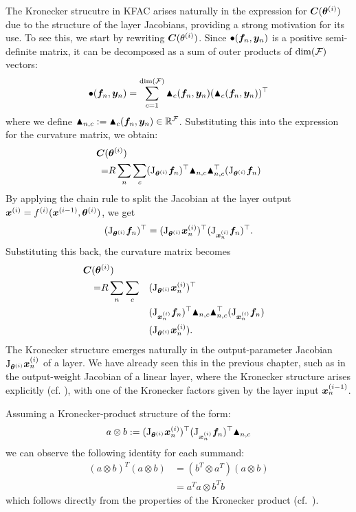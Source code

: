 The Kronecker strucutre in KFAC arises naturally in the expression for ${\bm{C}}({\bm{\theta}}^{(i)})$ due to the structure of the layer Jacobians, providing a strong motivation for its use.
To see this, we start by rewriting ${\bm{C}}(\theta^{(i)})$.
Since $\bullet({\bm{f}}_n, {\bm{y}}_n)$ is a positive semi-definite matrix, it can be decomposed as a sum of outer products of $\dim({\mathcal{F}})$ vectors: $$\bullet({\bm{f}}_n, {\bm{y}}_n) = \sum_{c=1}^{\dim({\mathcal{F}})} \blacktriangle_c({\bm{f}}_n, {\bm{y}}_n) (\blacktriangle_c({\bm{f}}_n, {\bm{y}}_n))^{\top}$$
where we define $\blacktriangle_{n,c} := \blacktriangle_c({\bm{f}}_n, {\bm{y}}_n) \in {\mathbb{R}}^{{\mathcal{F}}}$.
Substituting this into the expression for the curvature matrix, we obtain:
\begin{align*}
  {\bm{C}}(&{\bm{\theta}}^{(i)}) \\
  =&
  R \sum_n \sum_{c}
  (\mathrm{J}_{{\bm{\theta}}^{(i)}} {\bm{f}}_n)^{\top}
  \blacktriangle_{n,c} \blacktriangle_{n,c}^{\top}
  (\mathrm{J}_{{\bm{\theta}}^{(i)}} {\bm{f}}_n)
\end{align*}
By applying the chain rule to split the Jacobian at the layer output ${\bm{x}}^{(i)} = f^{(i)}({\bm{x}}^{(i-1)}, {\bm{\theta}}^{(i)})$, we get
\begin{align*}
  (\mathrm{J}_{{\bm{\theta}}^{(i)}} {\bm{f}}_n)^{\top}
  =
  (\mathrm{J}_{{\bm{\theta}}^{(i)}} {\bm{x}}^{(i)}_n)^{\top}
  (\mathrm{J}_{{\bm{x}}_n^{(i)}} {\bm{f}}_n)^{\top}.
\end{align*}
Substituting this back, the curvature matrix becomes
\begin{align*}
  {\bm{C}}({\bm{\theta}}&^{(i)}) \\ =& R \sum_n \sum_{c}
  &&(\mathrm{J}_{{\bm{\theta}}^{(i)}} {\bm{x}}^{(i)}_n)^{\top} \\
  & &&(\mathrm{J}_{{\bm{x}}_n^{(i)}} {\bm{f}}_n)^{\top}
  \blacktriangle_{n,c}
  \blacktriangle_{n,c}^{\top}
  (\mathrm{J}_{{\bm{x}}_n^{(i)}} {\bm{f}}_n) \\
  & &&(\mathrm{J}_{{\bm{\theta}}^{(i)}} {\bm{x}}^{(i)}_n).
\end{align*}
The Kronecker structure emerges naturally in the output-parameter Jacobian $\mathrm{J}_{{\bm{\theta}}^{(i)}} {\bm{x}}_n^{(i)}$ of a layer.
We have already seen this in the previous chapter, such as in the output-weight Jacobian of a linear layer, where the Kronecker structure arises explicitly (cf. ), with one of the Kronecker factors given by the layer input ${\bm{x}}^{(i-1)}_n$.

Assuming a Kronecker-product structure of the form:
$$ a \otimes b := (\mathrm{J}_{{\bm{\theta}}^{(i)}} {\bm{x}}^{(i)}_n)^{\top}
(\mathrm{J}_{{\bm{x}}_n^{(i)}} {\bm{f}}_n)^{\top}
\blacktriangle_{n,c} $$
we can observe the following identity for each summand:
\begin{align*}
(a \otimes b)^T (a \otimes b) &= (b^T \otimes a^T)(a \otimes b) \\
&= a^Ta \otimes b^Tb
\end{align*}
which follows directly from the properties of the Kronecker product (cf.~).

